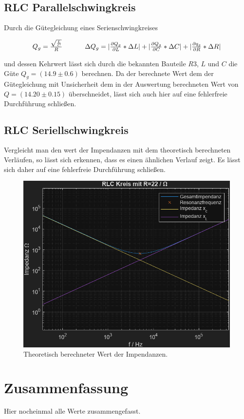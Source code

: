 \documentclass[12pt,a4paper,twoside]{article}
\begin{document}
\subsection{RLC Parallelschwingkreis}
Durch die Gütegleichung eines Serienschwingkreises

\begin{equation}
    \label{eq:Gütegleichung}
    \centerline{$Q_g = \frac{\sqrt{\frac{L}{C}}}{R}$ \\ $\Delta Q_g = \vert \frac{\partial Q_g}{\partial L} * \Delta L \vert + \vert \frac{\partial Q_g}{\partial C} * \Delta C \vert + \vert \frac{\partial q_g}{\partial R} * \Delta R \vert$}
\end{equation}

\noindent 
und dessen Kehrwert lässt sich durch die bekannten Bauteile $R3$, $L$ und $C$ die Güte $Q_g = (14.9 \pm 0.6) $ berechnen. 
Da der berechnete Wert dem der Gütegleichung mit Unsicherheit dem in der Auswertung berechneten Wert von $Q = (14.20 \pm 0.15) $ überschneidet, lässt sich auch hier auf eine fehlerfreie Durchführung schließen. 

\subsection{RLC Seriellschwingkreis}
Vergleicht man den wert der Impendanzen mit dem theoretisch berechneten Verläufen, so lässt sich erkennen, dass es einen ähnlichen Verlauf zeigt. 
Es lässt sich daher auf eine fehlerfreie Durchführung schließen. 

\begin{figure}[H]
    \centering
    \includegraphics[width=0.6\linewidth]{Matlab/4.png}
    \caption{Theoretisch berechneter Wert der Impendanzen.}
    \label{fig:disk 4} 
\end{figure}

\section{Zusammenfassung} %
Hier nocheinmal alle Werte zusammengefasst. 
\end{document}
